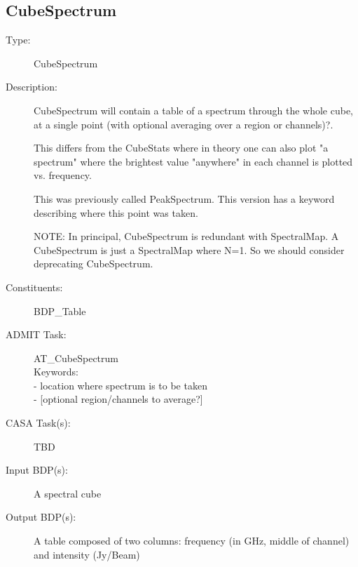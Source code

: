 \subsection{CubeSpectrum}
\begin{description}
\item[Type:] CubeSpectrum
\item[Description:]

CubeSpectrum will contain a table of a spectrum through the whole cube, at a
single point (with optional averaging over a region or channels)?.

This differs from the CubeStats where in theory one can also plot "a
spectrum" where the brightest value "anywhere" in each channel is plotted
vs. frequency.

This was previously called PeakSpectrum.  This version has a keyword
describing where this point was taken.

NOTE: In principal, CubeSpectrum is redundant with SpectralMap. A CubeSpectrum
is just a SpectralMap where N=1.  So we should consider deprecating CubeSpectrum.

\item[Constituents:] BDP\_Table

\item[ADMIT Task:] AT\_CubeSpectrum \\
  Keywords: \\
   - location where spectrum is to be taken \\
   - [optional region/channels to average?]

\item[CASA Task(s):]  TBD

\item[Input BDP(s):] A spectral cube 

\item[Output BDP(s):]

A table composed of two columns: frequency (in GHz, middle of channel)
   and intensity (Jy/Beam)
\end{description}
